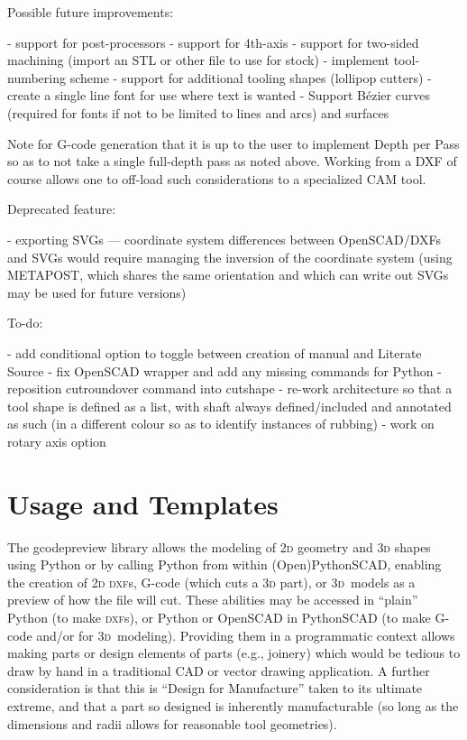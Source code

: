 \documentclass{ltxdoc}
\begin{document}
\begin{readme}
Possible future improvements:

 - support for post-processors
 - support for 4th-axis
 - support for two-sided machining (import an STL or other file to use for stock)
 - implement tool-numbering scheme
 - support for additional tooling shapes (lollipop cutters)
 - create a single line font for use where text is wanted
 - Support Bézier curves (required for fonts if not to be limited to lines and arcs) and surfaces

Note for G-code generation that it is up to the user to implement Depth per Pass so as to not take a single full-depth pass as noted above. Working from a DXF of course allows one to off-load such considerations to a specialized CAM tool.

Deprecated feature:

 - exporting SVGs --- coordinate system differences between OpenSCAD/DXFs and SVGs would require managing the inversion of the coordinate system (using METAPOST, which shares the same orientation and which can write out SVGs may be used for future versions)

To-do:

 -  add conditional option to toggle between creation of manual and Literate Source
 -  fix OpenSCAD wrapper and add any missing commands for Python
 -  reposition cutroundover command into cutshape
 -  re-work architecture so that a tool shape is defined as a list, with shaft always defined/included and annotated as such (in a different colour so as to identify instances of rubbing)
 -  work on rotary axis option

\end{readme}




\clearpage

\section{Usage and Templates}

The gcodepreview library allows the modeling of \textsc{2d} geometry and \textsc{3d} shapes using Python or by calling Python from within (Open)PythonSCAD, enabling the creation of \textsc{2d} \textsc{dxf}s, G-code (which cuts a \textsc{3d} part), or \textsc{3d}~models as a preview of how the file will cut. These abilities may be accessed in ``plain'' Python (to make \textsc{dxf}s), or Python or OpenSCAD in PythonSCAD (to make G-code and/or for \textsc{3d}~modeling). Providing them in a programmatic context allows making parts or design elements of parts (e.g., joinery) which would be tedious to draw by hand in a traditional CAD or vector drawing application. A further consideration is that this is ``Design for Manufacture'' taken to its ultimate extreme, and that a part so designed is inherently manufacturable (so long as the dimensions and radii allows for reasonable tool geometries).
\end{document}
